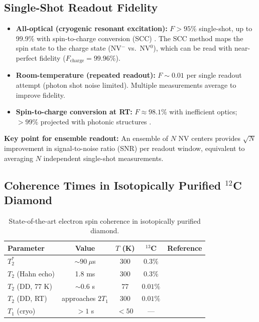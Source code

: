 \documentclass[11pt,letterpaper]{article}
\begin{document}
\subsection{Single-Shot Readout Fidelity}

\begin{itemize}
  \item \textbf{All-optical (cryogenic resonant excitation):} $F > 95\%$
    single-shot, up to 99.9\% with spin-to-charge conversion (SCC)
    \cite{Zhang2021}.  %
    The SCC method maps the spin state to the charge state
    (NV$^-$ vs.\ NV$^0$), which can be read with near-perfect fidelity
    ($F_{\text{charge}} = 99.96\%$). %
  \item \textbf{Room-temperature (repeated readout):} $F \sim 0.01$ per
    single readout attempt (photon shot noise limited).  Multiple
    measurements average to improve fidelity.
  \item \textbf{Spin-to-charge conversion at RT:} $F \approx 98.1\%$ with
    inefficient optics; $> 99\%$ projected with photonic structures
    \cite{Zhang2021}. %
\end{itemize}

\textbf{Key point for ensemble readout:}  An ensemble of $N$ NV centers
provides $\sqrt{N}$ improvement in signal-to-noise ratio (SNR) per readout
window, equivalent to averaging $N$ independent single-shot measurements.


\subsection{Coherence Times in Isotopically Purified $^{12}$C Diamond}

\begin{table}[h]
\centering
\caption{State-of-the-art electron spin coherence in isotopically purified diamond.}
\label{tab:coherence}
\begin{tabular}{lcccl}
\toprule
\textbf{Parameter} & \textbf{Value} & \textbf{$T$ (K)} & \textbf{$^{13}$C} & \textbf{Reference} \\
\midrule
$T_2^*$ & $\sim 90~\mu$s & 300 & 0.3\% & \cite{Maurer2012} \\   %
$T_2$ (Hahn echo) & 1.8 ms & 300 & 0.3\% & \cite{Balasubramanian2009} \\  %
$T_2$ (DD, 77 K) & $\sim 0.6$ s & 77 & $0.01\%$ & \cite{BarGill2013} \\  %
$T_2$ (DD, RT) & approaches $2T_1$ & 300 & $0.01\%$ & \cite{Cambria2025} \\  %
$T_1$ (cryo) & $> 1$ s & $< 50$ & --- & \cite{Jarmola2012} \\  %
\bottomrule
\end{tabular}
\end{table}
\end{document}
